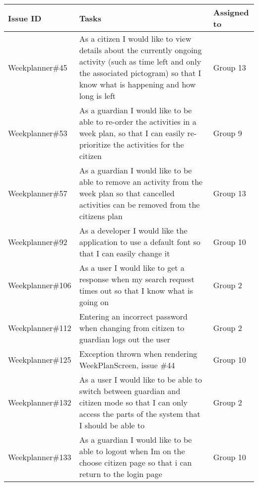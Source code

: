 \begin{longtable}{|p{2.9cm}|p{8cm}|p{2cm}|}
    \hline
    Issue ID        & Tasks                                                                                                                                                                             & Assigned to      \\ \hline
    Weekplanner\#45 & As a citizen I would like to view details about the currently ongoing activity (such as time left and only the associated pictogram) so that I know what is happening and how long is left & Group 13            \\ \hline
    Weekplanner\#53 & As a guardian I would like to be able to re-order the activities in a week plan, so that I can easily re-prioritize the activities for the citizen                                      & Group 9           \\ \hline
    Weekplanner\#57 & As a guardian I would like to be able to remove an activity from the week plan so that cancelled activities can be removed from the citizens plan                                    & Group 13           \\ \hline
    Weekplanner\#92 & As a developer I would like the application to use a default font so that I can easily change it                                                                                       & Group 10           \\ \hline
    Weekplanner\#106 & As a user I would like to get a response when my search request times out so that I know what is going on                                                                             & Group 2           \\ \hline
    Weekplanner\#112 & Entering an incorrect password when changing from citizen to guardian logs out the user                                                                                                  & Group 2          \\ \hline
    Weekplanner\#125 & Exception thrown when rendering WeekPlanScreen, issue \#44                                                                                                                             & Group 10           \\ \hline
    Weekplanner\#132 & As a user I would like to be able to switch between guardian and citizen mode so that I can only access the parts of the system that I should be able to                            & Group 2           \\ \hline
    Weekplanner\#133 & As a guardian I would like to be able to logout when Im on the choose citizen page so that i can return to the login page                                                              & Group 10           \\ \hline

\end{longtable}
